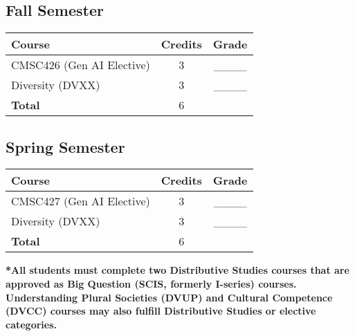 \subsection*{Fall Semester}
\begin{tabular}{|l|c|c|}
    \hline
    Course & Credits & Grade \\
    \hline
    CMSC426 (Gen AI Elective) & 3 & \_\_\_\_ \\
    Diversity (DVXX) & 3 & \_\_\_\_ \\
    \hline
    \textbf{Total} & 6 & \\
    \hline
\end{tabular}

\subsection*{Spring Semester}
\begin{tabular}{|l|c|c|}
    \hline
    Course & Credits & Grade \\
    \hline
    CMSC427 (Gen AI Elective) & 3 & \_\_\_\_ \\
    Diversity (DVXX) & 3 & \_\_\_\_ \\
    \hline
    \textbf{Total} & 6 & \\
    \hline
\end{tabular}

\vspace{1cm}
\textbf{*All students must complete two Distributive Studies courses that are approved as Big Question (SCIS, formerly I-series) courses. Understanding Plural Societies (DVUP) and Cultural Competence (DVCC) courses may also fulfill Distributive Studies or elective categories.}
